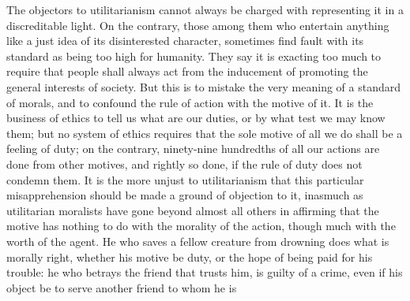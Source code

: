 The objectors to utilitarianism cannot always be  charged
with representing it in a discreditable light. On the contrary, those
among them who entertain anything like a just idea of its
disinterested character, sometimes find fault with its standard as
being too high for humanity. They say it is exacting too much to
require that people shall always act from the inducement of promoting
the general interests of society. But this is to mistake the very
meaning of a standard of morals, and to confound the rule of action
with the motive of it. It is the business of ethics to tell us what
are our duties, or by what test we may know them; but no system of
ethics requires that the sole motive of all we do shall be a feeling
of duty; on the contrary, ninety-nine hundredths of all our actions
are done from other motives, and rightly so done, if the rule of duty
does not condemn them. It is the more unjust to utilitarianism that
this particular misapprehension should be made a ground of objection
to it, inasmuch as utilitarian moralists have gone beyond almost all
others in affirming that the motive has nothing to do with the
morality of the action, though much with the worth of the agent. He
who saves a fellow creature from drowning does what is morally right,
whether his motive be duty, or the hope of being paid for his
trouble: he who betrays the friend that trusts him, is guilty of a
crime, even if his object be to serve another friend to whom he is
